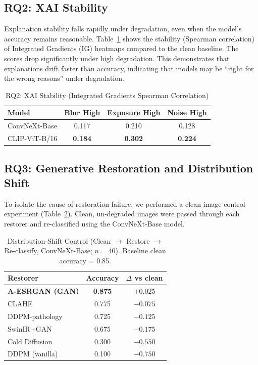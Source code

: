 \documentclass[runningheads]{llncs}
\begin{document}
\subsection{RQ2: XAI Stability}
Explanation stability falls rapidly under degradation, even when the model's accuracy remains reasonable. Table~\ref{tab:rq2_xai} shows the stability (Spearman correlation) of Integrated Gradients (IG) heatmaps compared to the clean baseline. The scores drop significantly under high degradation. This demonstrates that explanations drift faster than accuracy, indicating that models may be ``right for the wrong reasons'' under degradation.

\begin{table}[!t]
\caption{RQ2: XAI Stability (Integrated Gradients Spearman Correlation)}
\label{tab:rq2_xai}
\begin{center}
\begin{tabular}{lccc}
\toprule
\textbf{Model} & \textbf{Blur High} & \textbf{Exposure High} & \textbf{Noise High} \\
\midrule
ConvNeXt-Base & 0.117 & 0.210 & 0.128 \\
CLIP-ViT-B/16 & \textbf{0.184} & \textbf{0.302} & \textbf{0.224} \\
\bottomrule
\end{tabular}
\end{center}
\end{table}

\subsection{RQ3: Generative Restoration and Distribution Shift}
To isolate the cause of restoration failure, we performed a clean-image control experiment (Table~\ref{tab:dist_shift}). Clean, un-degraded images were passed through each restorer and re-classified using the ConvNeXt-Base model.

\begin{table}[!t]
\caption{Distribution-Shift Control (Clean $\rightarrow$ Restore $\rightarrow$ Re-classify, ConvNeXt-Base; $n=40$). Baseline clean accuracy = 0.85.}
\label{tab:dist_shift}
\begin{center}
\begin{tabular}{lcc}
\toprule
\textbf{Restorer} & \textbf{Accuracy} & \textbf{$\Delta$ vs clean} \\
\midrule
\textbf{A-ESRGAN (GAN)} & \textbf{0.875} & \textbf{$+0.025$} \\
CLAHE & 0.775 & $-0.075$ \\
DDPM-pathology & 0.725 & $-0.125$ \\
SwinIR+GAN & 0.675 & $-0.175$ \\
Cold Diffusion & 0.300 & $-0.550$ \\
DDPM (vanilla) & 0.100 & $-0.750$ \\
\bottomrule
\end{tabular}
\end{center}
\end{table}
\end{document}

